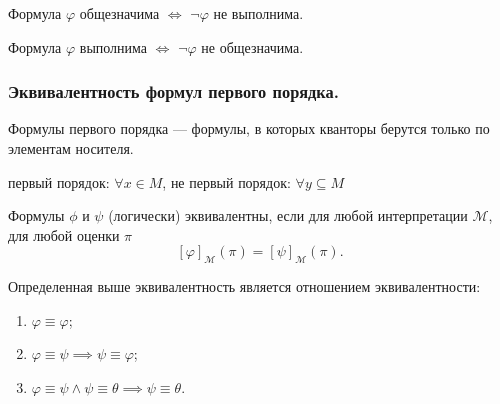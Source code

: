 \documentclass[a4paper, fleqn]{article}
\begin{document}
    \begin{lemma}
        Формула $\varphi$ общезначима $\iff$ $\neg \varphi$ не выполнима.
    \end{lemma}

    \begin{lemma}
        Формула $\varphi$ выполнима $\iff$ $\neg \varphi$ не общезначима.
    \end{lemma}

    \subsubsection{Эквивалентность формул первого порядка.}

    Формулы первого порядка --- формулы, в которых кванторы берутся только по элементам 
    носителя.
    \begin{example}
        первый порядок: $\forall x \in M$, 
        не первый порядок: $\forall y \subseteq M$
    \end{example}

    \begin{definition}
        Формулы $\phi$ и $\psi$ (логически) эквивалентны, если для любой интерпретации
        $\mathcal{M}$, для любой оценки $\pi$
        $$
            [\varphi]_{\mathcal{M}}(\pi) = [\psi]_{\mathcal{M}}(\pi).
        $$
    \end{definition}

    \begin{lemma}
        Определенная выше эквивалентность является отношением эквивалентности:
        \begin{enumerate}[topsep=0pt]
            \item $\varphi \equiv \varphi$;
            \item $\varphi \equiv \psi \implies \psi \equiv \varphi$;
            \item $\varphi \equiv \psi \land \psi \equiv \theta \implies \psi \equiv \theta$.
        \end{enumerate}
    \end{lemma}
\end{document}
